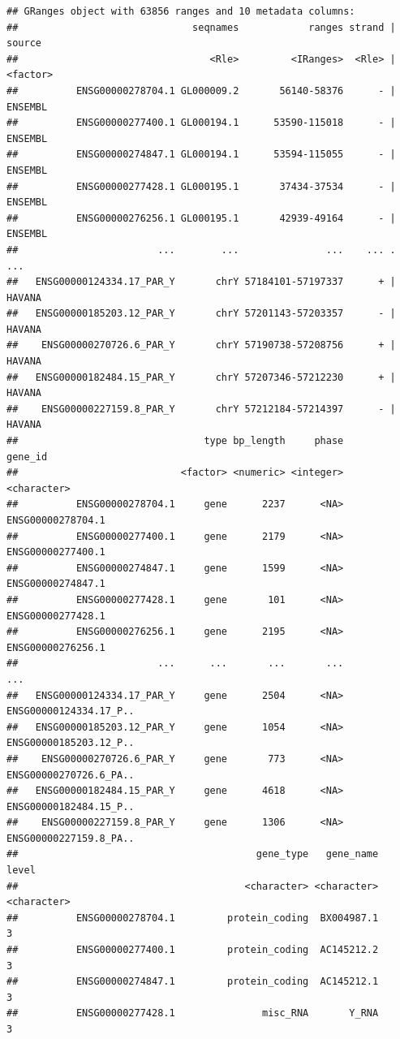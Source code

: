 \documentclass[
]{book}
\begin{document}
\begin{verbatim}
## GRanges object with 63856 ranges and 10 metadata columns:
##                              seqnames            ranges strand |   source
##                                 <Rle>         <IRanges>  <Rle> | <factor>
##          ENSG00000278704.1 GL000009.2       56140-58376      - |  ENSEMBL
##          ENSG00000277400.1 GL000194.1      53590-115018      - |  ENSEMBL
##          ENSG00000274847.1 GL000194.1      53594-115055      - |  ENSEMBL
##          ENSG00000277428.1 GL000195.1       37434-37534      - |  ENSEMBL
##          ENSG00000276256.1 GL000195.1       42939-49164      - |  ENSEMBL
##                        ...        ...               ...    ... .      ...
##   ENSG00000124334.17_PAR_Y       chrY 57184101-57197337      + |   HAVANA
##   ENSG00000185203.12_PAR_Y       chrY 57201143-57203357      - |   HAVANA
##    ENSG00000270726.6_PAR_Y       chrY 57190738-57208756      + |   HAVANA
##   ENSG00000182484.15_PAR_Y       chrY 57207346-57212230      + |   HAVANA
##    ENSG00000227159.8_PAR_Y       chrY 57212184-57214397      - |   HAVANA
##                                type bp_length     phase                gene_id
##                            <factor> <numeric> <integer>            <character>
##          ENSG00000278704.1     gene      2237      <NA>      ENSG00000278704.1
##          ENSG00000277400.1     gene      2179      <NA>      ENSG00000277400.1
##          ENSG00000274847.1     gene      1599      <NA>      ENSG00000274847.1
##          ENSG00000277428.1     gene       101      <NA>      ENSG00000277428.1
##          ENSG00000276256.1     gene      2195      <NA>      ENSG00000276256.1
##                        ...      ...       ...       ...                    ...
##   ENSG00000124334.17_PAR_Y     gene      2504      <NA> ENSG00000124334.17_P..
##   ENSG00000185203.12_PAR_Y     gene      1054      <NA> ENSG00000185203.12_P..
##    ENSG00000270726.6_PAR_Y     gene       773      <NA> ENSG00000270726.6_PA..
##   ENSG00000182484.15_PAR_Y     gene      4618      <NA> ENSG00000182484.15_P..
##    ENSG00000227159.8_PAR_Y     gene      1306      <NA> ENSG00000227159.8_PA..
##                                         gene_type   gene_name       level
##                                       <character> <character> <character>
##          ENSG00000278704.1         protein_coding  BX004987.1           3
##          ENSG00000277400.1         protein_coding  AC145212.2           3
##          ENSG00000274847.1         protein_coding  AC145212.1           3
##          ENSG00000277428.1               misc_RNA       Y_RNA           3

\end{verbatim}
\end{document}
